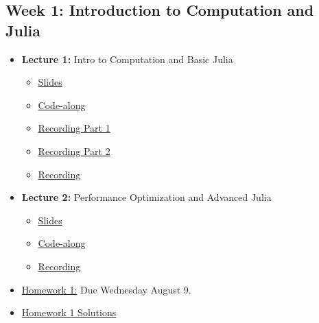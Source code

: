 \documentclass[
]{book}
\providecommand{\tightlist}{%
  \setlength{\itemsep}{0pt}\setlength{\parskip}{0pt}}
\begin{document}
\hypertarget{week-1-introduction-to-computation-and-julia}{%
\subsection{Week 1: Introduction to Computation and Julia}\label{week-1-introduction-to-computation-and-julia}}

\begin{itemize}
\tightlist
\item
  \textbf{Lecture 1:} Intro to Computation and Basic Julia

  \begin{itemize}
  \item
    \href{https://kevinghunt.github.io/ComputationCamp/lectures/Lecture1.html}{Slides}
  \item
    \href{https://kevinghunt.github.io/ComputationCamp/codealongs/CodeAlong1.jl}{Code-along}
  \item
    \href{https://uwmadison.zoom.us/rec/share/YbH5nwK8MFfdrG_79ab21fIChvq_GLK2G0cj1PuRpy29LgDW2ddl46KoGUvMzWoz.uN0dl820cFXMQ54_}{Recording Part 1}
  \item
    \href{https://uwmadison.zoom.us/rec/share/grQK03ljFWrQB5hBKKgoAVy9BuR5hg85PgyVvQJrXqJ5olG1fCe9vh336wh_L_yH.8-wkiBg4GIsDT3eC}{Recording Part 2}
  \item
    \href{-\%20https://uwmadison.zoom.us/rec/share/ANmR1Qr-iDoAxMOItHY9zgQk41_bbABcPN4eD3mVE5OVLvhzcXr80yBSEjEi8Dc.V7Hy_3yeHQm84srl}{Recording}
  \end{itemize}
\item
  \textbf{Lecture 2:} Performance Optimization and Advanced Julia

  \begin{itemize}
  \tightlist
  \item
    \href{https://kevinghunt.github.io/ComputationCamp/lectures/Lecture2.html}{Slides}
  \item
    \href{https://kevinghunt.github.io/ComputationCamp/codealongs/CodeAlong2.jl}{Code-along}
  \item
    \href{https://uwmadison.zoom.us/rec/share/ANmR1Qr-iDoAxMOItHY9zgQk41_bbABcPN4eD3mVE5OVLvhzcXr80yBSEjEi8Dc.V7Hy_3yeHQm84srl}{Recording}
  \end{itemize}
\item
  \href{https://kevinghunt.github.io/ComputationCamp/homeworks/homework1.html}{Homework 1:} Due Wednesday August 9.
\item
  \href{https://kevinghunt.github.io/ComputationCamp/homework_solutions/Homework1_solutions.jl}{Homework 1 Solutions}
\end{itemize}
\end{document}
